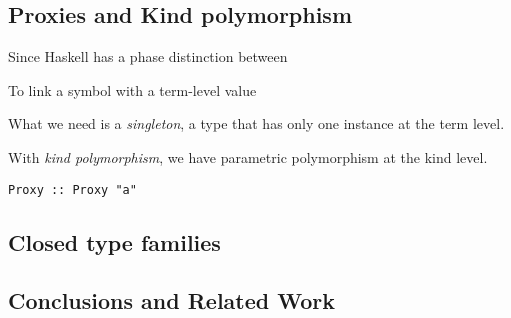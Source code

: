\documentclass[pldi]{sigplanconf-pldi16}
\begin{document}
%



\subsection{Proxies and Kind polymorphism}

Since Haskell has a phase distinction\cite{phasedistinction} between

To link a symbol with a term-level value

What we need is a \emph{singleton}\cite{singletons}, a type
that has only one instance at the term level.

With \emph{kind polymorphism}\cite{promotion}, we have parametric polymorphism
at the kind level.

\begin{verbatim}
Proxy :: Proxy "a"
\end{verbatim}

\subsection{Closed type families}

\subsection{Conclusions and Related Work}







%


%
\end{document}
